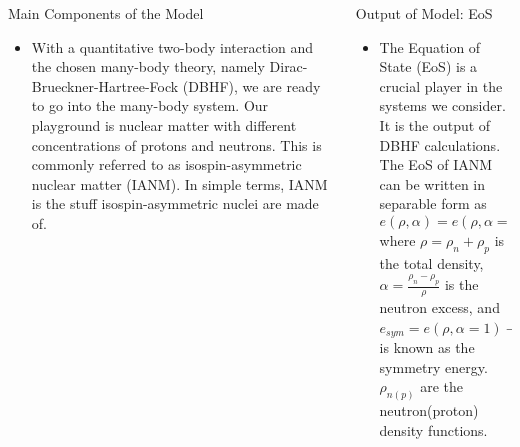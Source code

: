 \documentclass[serif]{beamer}
\begin{document}
\begin{frame}{}
\begin{columns}[t]
\begin{column}{0.32\paperwidth}
\begin{block}{Main Components of the Model}
\begin{itemize}
\begin{figure}[H]
\begin{center}
\caption{ Feynman diagram of a strong nucleon interaction mediated by the exchange of one boson. In the center of mass frame two nucleons have an initial momentum(energy) of $\pm q$($E$). After interacting via an exchange of a boson of mass $m_{\alpha}$ (which is the carrier of the strong force) the two nucleons emerge with a momentum(energy) of $\pm q^\prime$($E^\prime$). Time proceeds from bottom to top.  Simple analogy of the Feynman diagram. (Bottom/middle) Two people (nucleons) are standing apart from each other and a ball (boson) is exchanged between them. (Top) Due to the exchange of the ball (boson) the two people (nucleons) are farther apart.\label{fig:feynman}}
\end{center}
\end{figure}
\item \alert{With a quantitative two-body interaction and the chosen many-body theory, namely} \alert{Dirac-Brueckner-Hartree-Fock (DBHF), we are ready to go into the many-body system}. Our playground is nuclear matter with different concentrations of protons and neutrons. This is commonly referred to as isospin-asymmetric nuclear matter (IANM). In simple terms, IANM is the stuff isospin-asymmetric nuclei are made of.
\end{itemize}
\end{block}
\end{column}
\begin{column}{0.32\paperwidth}
\begin{block}{Output of Model: EoS}
\begin{itemize}
\item \alert{The Equation of State (EoS) is a crucial player in the systems we consider}. It is the output of DBHF calculations. The EoS of IANM can be written in separable form as
\begin{equation}
e(\rho,\alpha) = e(\rho,\alpha = 0) + e_{sym}(\rho)\alpha^2,
\end{equation}
where $\rho=\rho_n + \rho_p$ is the total density, $\alpha = \frac{\rho_n - \rho_p}{\rho}$ is the neutron excess, and $e_{sym}=e(\rho,\alpha=1)-e(\rho,\alpha=0)$ is known as the symmetry energy. $\rho_{n(p)}$ are the neutron(proton) density functions.
\begin{figure}[H]
\begin{center}

\end{center}
\end{figure}
\end{itemize}
\end{block}
\end{column}
\end{columns}
\end{frame}
\end{document}
